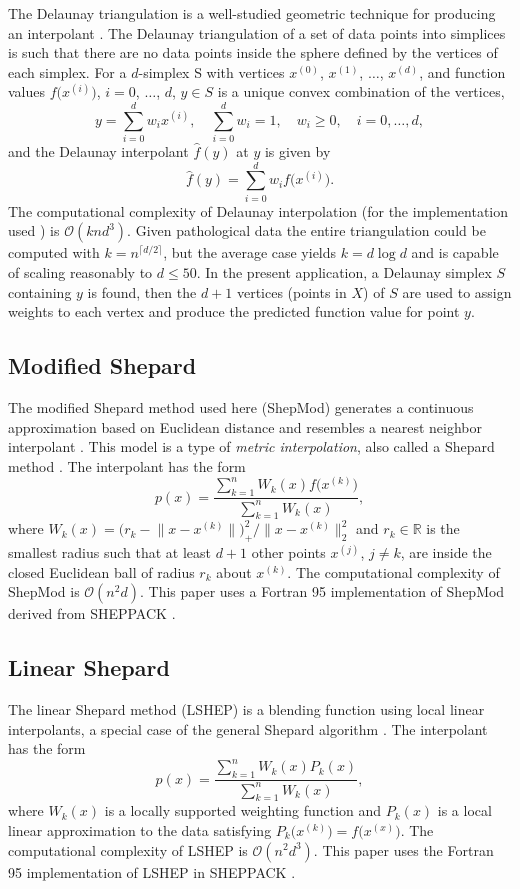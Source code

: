 \documentclass[smallextended,final]{svjour3}  %
\begin{document}
The Delaunay triangulation is a well-studied geometric technique for
producing an interpolant \cite{lee1980two}. The Delaunay triangulation
of a set of data points into simplices is such that there are no data
points inside the sphere defined by the vertices of each simplex. For
a $d$-simplex S with vertices $x^{(0)}$, $x^{(1)}$, $\ldots$,
$x^{(d)}$, and function values $f\bigl(x^{(i)}\bigr)$, $i=0$,
$\ldots$, $d$, $y \in S$ is a unique convex combination of the
vertices,
 $$ y = \sum_{i=0}^{d} w_i x^{(i)}, \quad \sum_{i=0}^{d} w_i = 1, \quad w_i \geq 0, \quad i=0,\ldots,d, $$
and the Delaunay interpolant $\hat f(y)$ at $y$ is given by
 $$ \hat f(y) = \sum_{i=0}^{d} w_i f\bigl(x^{(i)}\bigr). $$ The
computational complexity of Delaunay interpolation (for the
implementation used \cite{chang2018polynomial}) is $\mathcal{O}(k n
d^3)$. Given pathological data the entire triangulation could be
computed with $k = n^{\lceil d / 2 \rceil}$, but the average case yields
$k = d \log d$ and is capable of scaling reasonably to $d \leq 50$. In
the present application, a Delaunay simplex $S$ containing $y$ is
found, then the $d+1$ vertices (points in $X$) of $S$ are used to
assign weights to each vertex and produce the predicted function value
for point $y$.

\subsection{Modified Shepard}
\label{sec:modified-shepard}

The modified Shepard method used here (ShepMod) generates a continuous
approximation based on Euclidean distance and resembles a nearest
neighbor interpolant \cite{cover1967nearest}. This model is a type of
\textit{metric interpolation}, also called a Shepard method
\cite{gordon1978shepard,shepard1968two}. The interpolant has the form
 $$ p(x) = \frac{\sum\limits_{k=1}^{n}W_k(x)f\bigl(x^{(k)}\bigr)}
     {\sum\limits_{k=1}^{n}W_k(x)} ,$$
where $W_k(x) = \bigl(r_k - \bigl\|x - x^{(k)}\bigr\|\bigr)_+^2 \big/
\bigl\|x - x^{(k)}\bigr\|_2^2$ and $r_k \in \mathbb{R}$ is the
smallest radius such that at least $d+1$ other points $x^{(j)}$, $j
\not = k$, are inside the closed Euclidean ball of radius $r_k$ about
$x^{(k)}$. The computational complexity of ShepMod is
$\mathcal{O}(n^2d)$. This paper uses a Fortran 95 implementation of
ShepMod derived from SHEPPACK \cite{thacker2010algorithm}.

\subsection{Linear Shepard}
The linear Shepard method (LSHEP) is a blending function using local
linear interpolants, a special case of the general Shepard algorithm
\cite{thacker2010algorithm}. The interpolant has the form
 $$ p(x) = \frac{\sum\limits_{k=1}^{n}W_k(x)P_k(x)}
 {\sum\limits_{k=1}^{n}W_k(x)} ,$$
where $W_k(x)$ is a locally supported weighting function and $P_k(x)$
is a local linear approximation to the data satisfying
$P_k\bigl(x^{(k)}\bigr) = f\bigl(x^{(x)}\bigr)$. The computational
complexity of LSHEP is $\mathcal{O}(n^2d^3)$. This paper uses the
Fortran 95 implementation of LSHEP in SHEPPACK
\cite{thacker2010algorithm}.
\end{document}
